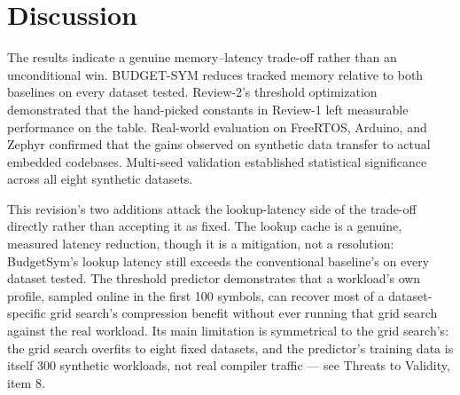 \documentclass[conference]{IEEEtran}
\begin{document}
\section{Discussion}
The results indicate a genuine memory--latency trade-off rather than an
unconditional win. BUDGET-SYM reduces tracked memory relative to both
baselines on every dataset tested. Review-2's threshold optimization
demonstrated that the hand-picked constants in Review-1 left measurable
performance on the table. Real-world evaluation on FreeRTOS, Arduino, and
Zephyr confirmed that the gains observed on synthetic data transfer to
actual embedded codebases. Multi-seed validation established statistical
significance across all eight synthetic datasets.

This revision's two additions attack the lookup-latency side of the
trade-off directly rather than accepting it as fixed. The lookup cache is a
genuine, measured latency reduction, though it is a mitigation, not a
resolution: BudgetSym's lookup latency still exceeds the conventional
baseline's on every dataset tested. The threshold predictor demonstrates
that a workload's own profile, sampled online in the first 100 symbols, can
recover most of a dataset-specific grid search's compression benefit without
ever running that grid search against the real workload. Its main
limitation is symmetrical to the grid search's: the grid search overfits to
eight fixed datasets, and the predictor's training data is itself 300
synthetic workloads, not real compiler traffic --- see Threats to Validity,
item 8.
\end{document}

